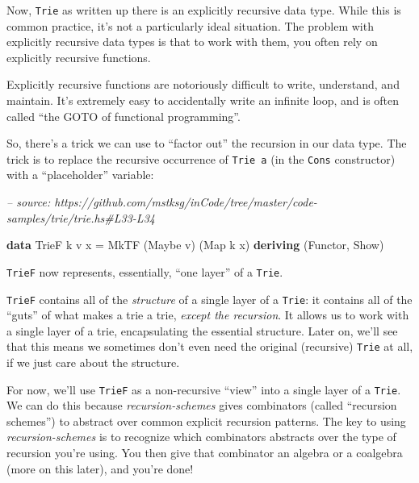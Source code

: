 \documentclass[]{article}
\newenvironment{Shaded}{}{}
\newcommand{\CommentTok}[1]{\textcolor[rgb]{0.38,0.63,0.69}{\textit{#1}}}
\newcommand{\DataTypeTok}[1]{\textcolor[rgb]{0.56,0.13,0.00}{#1}}
\newcommand{\FunctionTok}[1]{\textcolor[rgb]{0.02,0.16,0.49}{#1}}
\newcommand{\KeywordTok}[1]{\textcolor[rgb]{0.00,0.44,0.13}{\textbf{#1}}}
\newcommand{\NormalTok}[1]{#1}
\begin{document}
Now, \texttt{Trie} as written up there is an explicitly recursive data type.
While this is common practice, it's not a particularly ideal situation. The
problem with explicitly recursive data types is that to work with them, you
often rely on explicitly recursive functions.

Explicitly recursive functions are notoriously difficult to write, understand,
and maintain. It's extremely easy to accidentally write an infinite loop, and is
often called ``the GOTO of functional programming''.

So, there's a trick we can use to ``factor out'' the recursion in our data type.
The trick is to replace the recursive occurrence of \texttt{Trie\ a} (in the
\texttt{Cons} constructor) with a ``placeholder'' variable:

\begin{Shaded}
\begin{Highlighting}[]
\CommentTok{-- source: https://github.com/mstksg/inCode/tree/master/code-samples/trie/trie.hs#L33-L34}

\KeywordTok{data} \DataTypeTok{TrieF}\NormalTok{ k v x }\FunctionTok{=} \DataTypeTok{MkTF}\NormalTok{ (}\DataTypeTok{Maybe}\NormalTok{ v) (}\DataTypeTok{Map}\NormalTok{ k x)}
  \KeywordTok{deriving}\NormalTok{ (}\DataTypeTok{Functor}\NormalTok{, }\DataTypeTok{Show}\NormalTok{)}
\end{Highlighting}
\end{Shaded}

\texttt{TrieF} now represents, essentially, ``one layer'' of a \texttt{Trie}.

\texttt{TrieF} contains all of the \emph{structure} of a single layer of a
\texttt{Trie}: it contains all of the ``guts'' of what makes a trie a trie,
\emph{except the recursion}. It allows us to work with a single layer of a trie,
encapsulating the essential structure. Later on, we'll see that this means we
sometimes don't even need the original (recursive) \texttt{Trie} at all, if we
just care about the structure.

For now, we'll use \texttt{TrieF} as a non-recursive ``view'' into a single
layer of a \texttt{Trie}. We can do this because \emph{recursion-schemes} gives
combinators (called ``recursion schemes'') to abstract over common explicit
recursion patterns. The key to using \emph{recursion-schemes} is to recognize
which combinators abstracts over the type of recursion you're using. You then
give that combinator an algebra or a coalgebra (more on this later), and you're
done!
\end{document}
